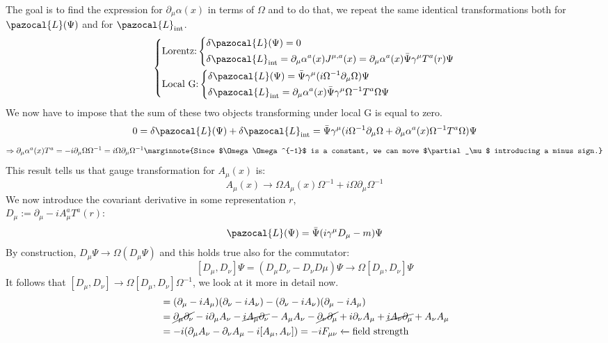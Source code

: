 \documentclass[../main.tex]{subfiles}
\begin{document}
The goal is to find the expression for $\partial_\mu\alpha(x)$ in terms of $\Omega$ and to do that, we repeat the same identical transformations both for $\pazocal{L}(\Psi)$ and for $\pazocal{L}_{\text{int}}$.
\[
\left\{
\begin{aligned}
&\text{Lorentz:}\left\{
\begin{aligned}
&\delta\pazocal{L}(\Psi)=0\\
&\delta\pazocal{L}_{\text{int}}=\partial_\mu\alpha^a(x)J^{\mu,a}(x)=\partial_\mu\alpha^a(x)\Bar{\Psi}\gamma^\mu T^a(r)\Psi
\end{aligned}
\right.\\
&\text{Local G:}\left\{
\begin{aligned}
&\delta\pazocal{L}(\Psi)=\Bar{\Psi}\gamma^\mu(i\Omega^{-1}\partial_\mu\Omega)\Psi\\
&\delta\pazocal{L}_{\text{int}}=\partial_\mu\alpha^a(x)\Bar{\Psi}\gamma^\mu\Omega^{-1}T^a\Omega\Psi
\end{aligned}
\right.
\end{aligned}
\right.
\]
We now have to impose that the sum of these two objects transforming under local G is equal to zero.
\[
0=\delta\pazocal{L}(\Psi)+\delta\pazocal{L}_{\text{int}}=\Bar{\Psi}\gamma^\mu(i\Omega^{-1}\partial_\mu\Omega+\partial_\mu\alpha^a(x)\Omega^{-1}T^a\Omega)\Psi
\]
\[
\Rightarrow\partial_\mu\alpha^a(x)T^a=-i\partial_\mu\Omega\Omega^{-1}=i\Omega\partial_\mu\Omega^{-1}\marginnote{Since $\Omega\Omega^{-1}$ is a constant, we can move $\partial_\mu$ introducing a minus sign.}
\]
This result tells us that gauge transformation for $A_\mu(x)$ is:
\[
A_\mu(x)\to\Omega A_\mu(x)\Omega^{-1}+i\Omega\partial_\mu\Omega^{-1}
\]
We now introduce the covariant derivative in some representation $r$,\\
$D_\mu:=\partial_\mu-iA_\mu^a T^a(r)$:
\[
\pazocal{L}(\Psi)=\Bar{\Psi}(i\gamma^\mu D_\mu-m)\Psi
\]
By construction, $D_\mu\Psi\to\Omega(D_\mu\Psi)$ and this holds true also for the commutator:
\[
[D_\mu,D_\nu]\Psi=(D_\mu D_\nu-D_\nu D\mu)\Psi\to\Omega[D_\mu,D_\nu]\Psi
\]
It follows that $[D_\mu,D_\nu]\to\Omega[D_\mu,D_\nu]\Omega^{-1}$, we look at it more in detail now.
\begin{align*}
[D_\mu,D_\nu]&=(\partial_\mu-iA_\mu)(\partial_\nu-iA_\nu)-(\partial_\nu-iA_\nu)(\partial_\mu-iA_\mu)\\
&=\cancel{\partial_\mu\partial_\nu}-i\partial_\mu A_\nu-\cancel{iA_\mu\partial_\nu}-A_\mu A_\nu-\cancel{\partial_\nu\partial_\mu}+i\partial_\nu A_\mu+\cancel{iA_\nu\partial_\mu}+A_\nu A_\mu\\
&=-i(\partial_\mu A_\nu-\partial_\nu A_\mu-i[A_\mu,A_\nu])=-iF_{\mu\nu}\xleftarrow[]{}\text{field strength}
\end{align*}
\end{document}
